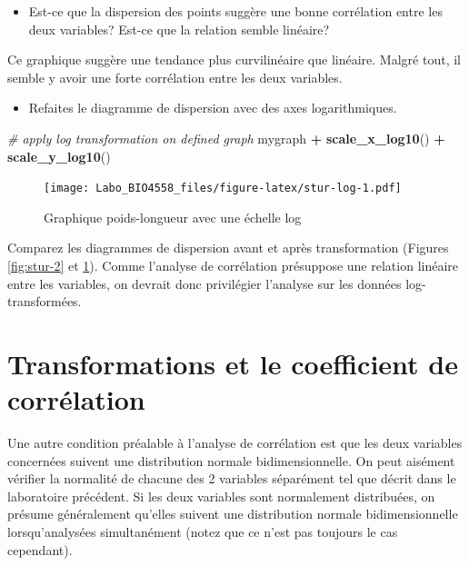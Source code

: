 \documentclass[12pt,]{book}
\newenvironment{Shaded}{\begin{snugshade}}{\end{snugshade}}
\newcommand{\CommentTok}[1]{\textcolor[rgb]{0.37,0.37,0.37}{\textit{#1}}}
\newcommand{\KeywordTok}[1]{\textcolor[rgb]{0.27,0.27,0.27}{\textbf{#1}}}
\newcommand{\NormalTok}[1]{#1}
\newcommand{\OperatorTok}[1]{\textcolor[rgb]{0.43,0.43,0.43}{\textbf{#1}}}
\newcommand{\StringTok}[1]{\textcolor[rgb]{0.5,0.5,0.5}{#1}}
\providecommand{\tightlist}{%
  \setlength{\itemsep}{0pt}\setlength{\parskip}{0pt}}
\begin{document}
\begin{itemize}
\tightlist
\item
  Est-ce que la dispersion des points suggère une bonne corrélation entre les deux variables?
  Est-ce que la relation semble linéaire?
\end{itemize}

Ce graphique suggère une tendance plus curvilinéaire que linéaire.
Malgré tout, il semble y avoir une forte corrélation entre les deux variables.

\begin{itemize}
\tightlist
\item
  Refaites le diagramme de dispersion avec des axes logarithmiques.
\end{itemize}

\begin{Shaded}
\begin{Highlighting}[]
\CommentTok{# apply log transformation on defined graph}
\NormalTok{mygraph }\OperatorTok{+}\StringTok{ }\KeywordTok{scale_x_log10}\NormalTok{() }\OperatorTok{+}\StringTok{ }\KeywordTok{scale_y_log10}\NormalTok{()}
\end{Highlighting}
\end{Shaded}

\begin{figure}
\centering
\texttt{[image: Labo\_BIO4558\_files/figure-latex/stur-log-1.pdf]}
\caption{\label{fig:stur-log}Graphique poids-longueur avec une échelle log}
\end{figure}

Comparez les diagrammes de dispersion avant et après transformation (Figures \ref{fig:stur-2} et \ref{fig:stur-log}). Comme l'analyse de corrélation présuppose une relation linéaire entre les variables, on devrait donc privilégier l'analyse sur les données log-transformées.

\hypertarget{transformations-et-le-coefficient-de-corruxe9lation}{%
\section{Transformations et le coefficient de corrélation}\label{transformations-et-le-coefficient-de-corruxe9lation}}

Une autre condition préalable à l'analyse de corrélation est que les deux variables concernées suivent une distribution normale bidimensionnelle.
On peut aisément vérifier la normalité de chacune des 2 variables séparément tel que décrit dans le laboratoire précédent.
Si les deux variables sont normalement distribuées, on présume généralement qu'elles suivent une distribution normale bidimensionnelle lorsqu'analysées simultanément (notez que ce n'est pas toujours le cas cependant).
\end{document}
